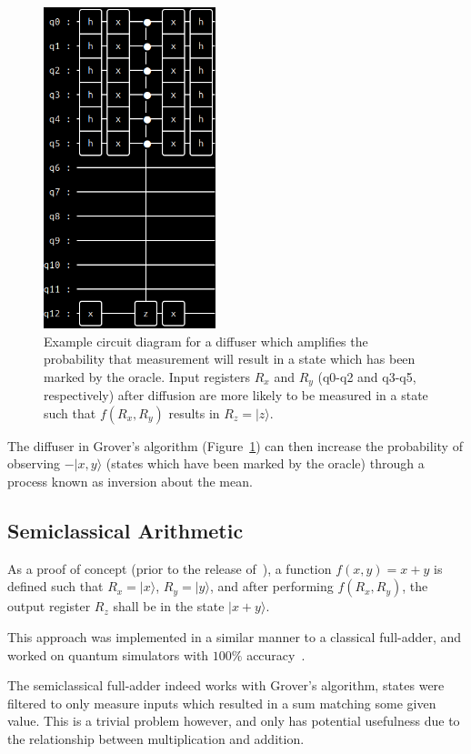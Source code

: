 \documentclass[twocolumn]{cinc}
\begin{document}
  \begin{figure}[h]\label{fig:FIGURA3}
  \centering
  \includegraphics[width=5.0cm]{diffuse.png}
  \caption{Example circuit diagram for a diffuser which amplifies the probability that
  measurement will result in a state which has been marked by the oracle.
  Input registers $R_x$ and $R_y$ (q0-q2 and q3-q5, respectively) after diffusion are 
  more likely to be measured in a state such that $f(R_x,R_y)$ results in $R_z=|z\rangle$.}
  \end{figure}

  The diffuser in Grover's algorithm (Figure~\ref{fig:FIGURA3}) can then increase the 
  probability of observing $-|x,y\rangle$ (states which have been marked by the oracle) 
  through a process known as inversion about the mean.

  \subsection{Semiclassical Arithmetic} 

  As a proof of concept (prior to the release of~\cite{quantum_factoring}),
  a function $f(x,y)=x+y$ is defined such that $R_x=|x\rangle$, $R_y=|y\rangle$,
  and after performing $f(R_x,R_y)$, the output register $R_z$ shall be in the
  state $|x+y\rangle$.
  
  This approach was implemented in a similar manner to a classical full-adder,
  and worked on quantum simulators with $100\%$ accuracy~\cite{quantum_full_adder}.

  The semiclassical full-adder indeed works with Grover's algorithm, states were
  filtered to only measure inputs which resulted in a sum matching some given value.
  This is a trivial problem however, and only has potential usefulness due to the 
  relationship between multiplication and addition.
\end{document}
